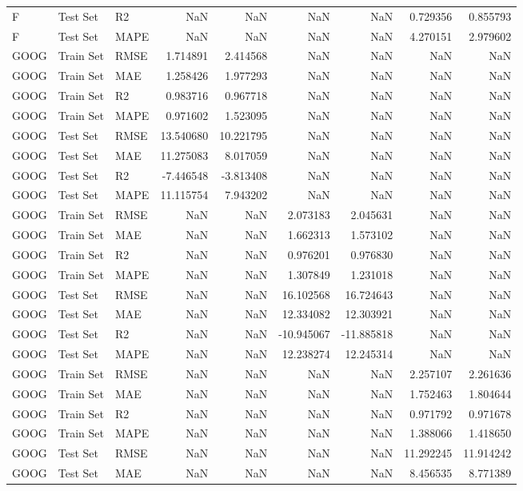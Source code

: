 \begin{tabular}{lllrrrrrr}
F & Test Set & R2 & NaN & NaN & NaN & NaN & 0.729356 & 0.855793 \\
F & Test Set & MAPE & NaN & NaN & NaN & NaN & 4.270151 & 2.979602 \\
GOOG & Train Set & RMSE & 1.714891 & 2.414568 & NaN & NaN & NaN & NaN \\
GOOG & Train Set & MAE & 1.258426 & 1.977293 & NaN & NaN & NaN & NaN \\
GOOG & Train Set & R2 & 0.983716 & 0.967718 & NaN & NaN & NaN & NaN \\
GOOG & Train Set & MAPE & 0.971602 & 1.523095 & NaN & NaN & NaN & NaN \\
GOOG & Test Set & RMSE & 13.540680 & 10.221795 & NaN & NaN & NaN & NaN \\
GOOG & Test Set & MAE & 11.275083 & 8.017059 & NaN & NaN & NaN & NaN \\
GOOG & Test Set & R2 & -7.446548 & -3.813408 & NaN & NaN & NaN & NaN \\
GOOG & Test Set & MAPE & 11.115754 & 7.943202 & NaN & NaN & NaN & NaN \\
GOOG & Train Set & RMSE & NaN & NaN & 2.073183 & 2.045631 & NaN & NaN \\
GOOG & Train Set & MAE & NaN & NaN & 1.662313 & 1.573102 & NaN & NaN \\
GOOG & Train Set & R2 & NaN & NaN & 0.976201 & 0.976830 & NaN & NaN \\
GOOG & Train Set & MAPE & NaN & NaN & 1.307849 & 1.231018 & NaN & NaN \\
GOOG & Test Set & RMSE & NaN & NaN & 16.102568 & 16.724643 & NaN & NaN \\
GOOG & Test Set & MAE & NaN & NaN & 12.334082 & 12.303921 & NaN & NaN \\
GOOG & Test Set & R2 & NaN & NaN & -10.945067 & -11.885818 & NaN & NaN \\
GOOG & Test Set & MAPE & NaN & NaN & 12.238274 & 12.245314 & NaN & NaN \\
GOOG & Train Set & RMSE & NaN & NaN & NaN & NaN & 2.257107 & 2.261636 \\
GOOG & Train Set & MAE & NaN & NaN & NaN & NaN & 1.752463 & 1.804644 \\
GOOG & Train Set & R2 & NaN & NaN & NaN & NaN & 0.971792 & 0.971678 \\
GOOG & Train Set & MAPE & NaN & NaN & NaN & NaN & 1.388066 & 1.418650 \\
GOOG & Test Set & RMSE & NaN & NaN & NaN & NaN & 11.292245 & 11.914242 \\
GOOG & Test Set & MAE & NaN & NaN & NaN & NaN & 8.456535 & 8.771389 \\

\end{tabular}
